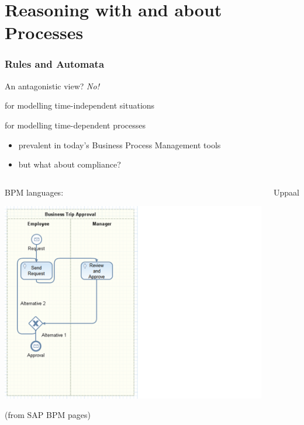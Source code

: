 \documentclass{beamer}
\begin{document}
\section{Reasoning with and about Processes}


\begin{frame}[fragile]\frametitle{Rules and Automata}

  An antagonistic view? \emph{No!}

 for modelling time-independent situations

 for modelling time-dependent processes
\begin{itemize}
\item prevalent in today's Business Process Management tools
\item but what about compliance?
\end{itemize}

\begin{columns}
  \begin{center}
  BPM languages:

    \includegraphics[scale=0.2]{Figures/business_process.png}
    
    \tiny{(from  SAP BPM pages)}
  \end{center}
  \begin{center}
    Uppaal 
  

\end{center}
\end{columns}
\end{frame}
\end{document}
